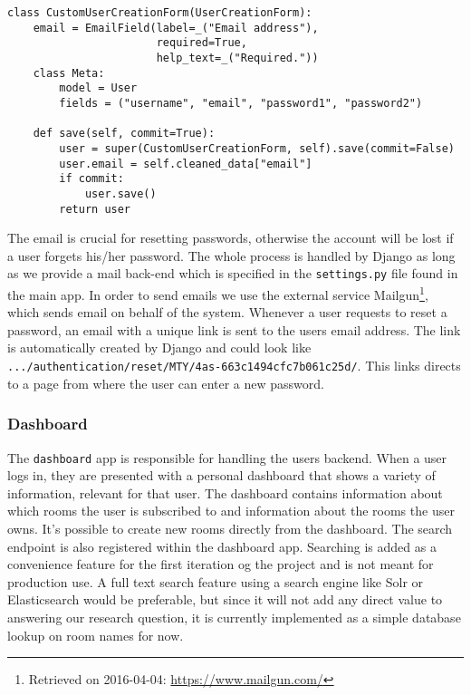 \begin{lstlisting}[caption=CustomUserCreationForm class, label=lst:custom-user-creation-form-class]
class CustomUserCreationForm(UserCreationForm):
    email = EmailField(label=_("Email address"), 
                       required=True, 
                       help_text=_("Required."))
    class Meta:
        model = User
        fields = ("username", "email", "password1", "password2")

    def save(self, commit=True):
        user = super(CustomUserCreationForm, self).save(commit=False)
        user.email = self.cleaned_data["email"]
        if commit:
            user.save()
        return user
\end{lstlisting}

The email is crucial for resetting passwords, otherwise the account will be lost if a user forgets his/her password. The whole process is handled by Django as long as we provide a mail back-end which is specified in the \texttt{settings.py} file found in the main app. In order to send emails we use the external service Mailgun\footnote{Retrieved on 2016-04-04: \url{https://www.mailgun.com/}}, which sends email on behalf of the system. Whenever a user requests to reset a password, an email with a unique link is sent to the users email address. The link is automatically created by Django and could look like \texttt{.../authentication/reset/MTY/4as-663c1494cfc7b061c25d/}. This links directs to a page from where the user can enter a new password.

\subsubsection*{Dashboard}
The \texttt{dashboard} app is responsible for handling the users backend. When a user logs in, they are presented with a personal dashboard that shows a variety of information, relevant for that user.
The dashboard contains information about which rooms the user is subscribed to and information about the rooms the user owns. It's possible to create new rooms directly from the dashboard. The search endpoint is also registered within the dashboard app. Searching is added as a convenience feature for the first iteration og the project and is not meant for production use. A full text search feature using a search engine like Solr or Elasticsearch would be preferable, but since it will not add any direct value to answering our research question, it is currently implemented as a simple database lookup on room names for now.


